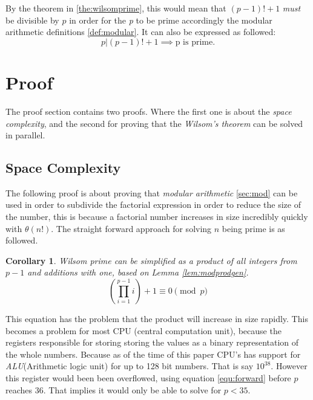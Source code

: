 \documentclass[12pt, oneside, onecolumn]{article}
\newtheorem{corollary}{Corollary}[theorem]
\begin{document}
By the theorem in \ref{the:wilsomprime}, this would mean that $(p-1)! + 1 $ \emph{must} be divisible by $p$ in order for the \emph{p} to be prime accordingly the modular arithmetic definitions \ref{def:modular}. It can also be expressed as followed:
\begin{equation}
p | (p - 1)! + 1 \implies \text{p is prime.}
\end{equation}

\section{Proof}\label{sec:proof}
The proof section contains two proofs. Where the first one is about the \emph{space complexity}, and the second for proving that the \emph{Wilsom's theorem} can be solved in parallel.

\subsection{Space Complexity}\label{pro:spacecomplexity}
The following proof is about proving that \emph{modular arithmetic} \ref{sec:mod} can be used in order to subdivide the factorial expression in order to reduce the size of the number, this is because a factorial number increases in size incredibly quickly with $\theta(n!)$. The straight forward approach for solving $n$ being prime is as followed.

\begin{corollary}{}
Wilsom prime can be simplified as a product of all integers from $p - 1$ and additions with one, based on Lemma \ref{lem:modprodgen}.
\begin{equation}\label{equ:forward}
 \left( \prod_{i = 1}^{p-1} i \right) + 1 \equiv 0 \pmod p
\end{equation}

\end{corollary}


This equation has the problem that the product will increase in size rapidly. This becomes a problem for most CPU (central computation unit), because the registers responsible for storing storing the values as a binary representation of the whole numbers. Because as of the time of this paper CPU's has support for \emph{ALU}(Arithmetic logic unit) for up to 128 bit numbers. That is say $10^{38}$. However this register would been been overflowed, using equation \ref{equ:forward} before $p$ reaches $36$. That implies it would only be able to solve for $p < 35$.
\end{document}
